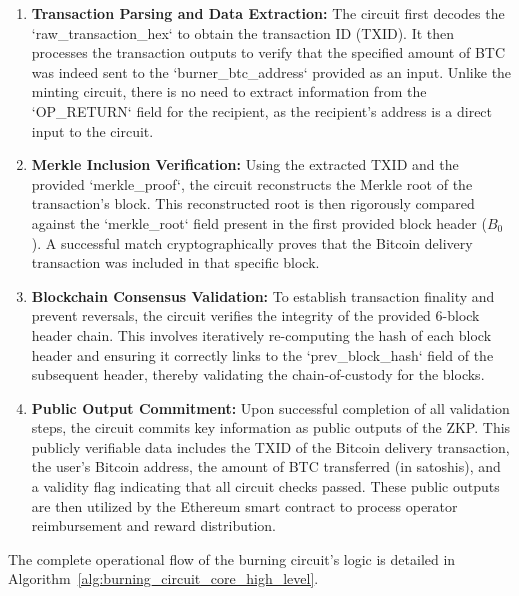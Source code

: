 \documentclass{DESSThesis}
\begin{document}
\begin{enumerate}
    \item \textbf{Transaction Parsing and Data Extraction:} The circuit first decodes the `raw\_transaction\_hex` to obtain the transaction ID (TXID). It then processes the transaction outputs to verify that the specified amount of BTC was indeed sent to the `burner\_btc\_address` provided as an input. Unlike the minting circuit, there is no need to extract information from the `OP\_RETURN` field for the recipient, as the recipient's address is a direct input to the circuit.
    \item \textbf{Merkle Inclusion Verification:} Using the extracted TXID and the provided `merkle\_proof`, the circuit reconstructs the Merkle root of the transaction's block. This reconstructed root is then rigorously compared against the `merkle\_root` field present in the first provided block header ($B_0$). A successful match cryptographically proves that the Bitcoin delivery transaction was included in that specific block.
    \item \textbf{Blockchain Consensus Validation:} To establish transaction finality and prevent reversals, the circuit verifies the integrity of the provided 6-block header chain. This involves iteratively re-computing the hash of each block header and ensuring it correctly links to the `prev\_block\_hash` field of the subsequent header, thereby validating the chain-of-custody for the blocks.
    \item \textbf{Public Output Commitment:} Upon successful completion of all validation steps, the circuit commits key information as public outputs of the ZKP. This publicly verifiable data includes the TXID of the Bitcoin delivery transaction, the user's Bitcoin address, the amount of BTC transferred (in satoshis), and a validity flag indicating that all circuit checks passed. These public outputs are then utilized by the Ethereum smart contract to process operator reimbursement and reward distribution.
\end{enumerate}
The complete operational flow of the burning circuit's logic is detailed in Algorithm~\ref{alg:burning_circuit_core_high_level}.
\end{document}
